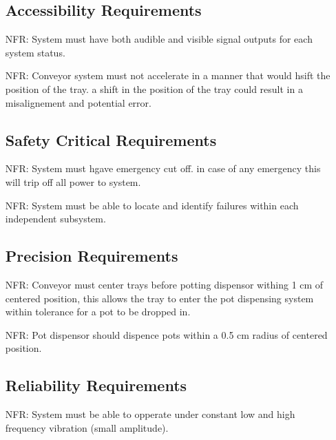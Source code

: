 \documentclass[12pt]{article}
\newcounter{nfrnum} %
\begin{document}
\begin{itemize}
\subsection{Accessibility Requirements}
\item[NFR\refstepcounter{nfrnum}\thenfrnum \label{NFR_Portability}:]
System must have both audible and visible signal outputs for each system status.

\item[NFR\refstepcounter{nfrnum}\thenfrnum \label{NFR_Portability}:]
Conveyor system must not accelerate in a manner that would hsift the position of the tray. a shift in the position of the tray could result in a misalignement and potential error.


\subsection{Safety Critical Requirements}
\item[NFR\refstepcounter{nfrnum}\thenfrnum \label{NFR_Portability}:]
System must hgave emergency cut off. in case of any emergency this will trip off all power to system.

\item[NFR\refstepcounter{nfrnum}\thenfrnum \label{NFR_Portability}:]
System must be able to locate and identify failures  within each independent subsystem.

\subsection{Precision Requirements}
\item[NFR\refstepcounter{nfrnum}\thenfrnum \label{NFR_Portability}:]
Conveyor must center trays before potting dispensor withing 1 cm of centered position, this allows the tray to enter the pot dispensing system within tolerance for a pot to be dropped in.

\item[NFR\refstepcounter{nfrnum}\thenfrnum \label{NFR_Portability}:]
Pot dispensor should dispence pots within a 0.5 cm radius of centered position.

\subsection{Reliability Requirements}
\item[NFR\refstepcounter{nfrnum}\thenfrnum \label{NFR_Portability}:]
System must be able to opperate under constant low and high frequency vibration (small amplitude).


\end{itemize}
\end{document}

